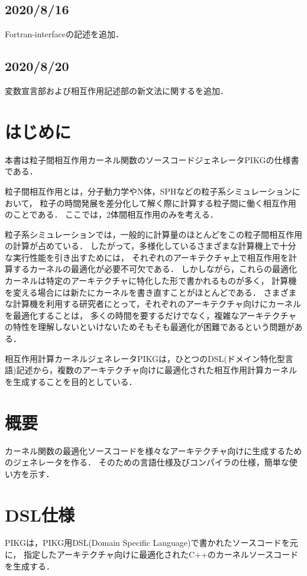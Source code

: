 \documentclass{article}
\begin{document}
\subsection{2020/8/16}
Fortran-interfaceの記述を追加．
\subsection{2020/8/20}
変数宣言部および相互作用記述部の新文法に関するを追加．

\section{はじめに}
本書は粒子間相互作用カーネル関数のソースコードジェネレータPIKGの仕様書である．

粒子間相互作用とは，分子動力学やN体，SPHなどの粒子系シミュレーションにおいて，
粒子の時間発展を差分化して解く際に計算する粒子間に働く相互作用のことである．
ここでは，2体間相互作用のみを考える．

粒子系シミュレーションでは，一般的に計算量のほとんどをこの粒子間相互作用の計算が占めている．
したがって，多様化しているさまざまな計算機上で十分な実行性能を引き出すためには，
それぞれのアーキテクチャ上で相互作用を計算するカーネルの最適化が必要不可欠である．
しかしながら，これらの最適化カーネルは特定のアーキテクチャに特化した形で書かれるものが多く，
計算機を変える場合には新たにカーネルを書き直すことがほとんどである．
さまざまな計算機を利用する研究者にとって，それぞれのアーキテクチャ向けにカーネルを最適化することは，
多くの時間を要するだけでなく，複雑なアーキテクチャの特性を理解しないといけないためそもそも最適化が困難であるという問題がある．

相互作用計算カーネルジェネレータPIKGは，ひとつのDSL(ドメイン特化型言語)記述から，複数のアーキテクチャ向けに最適化された相互作用計算カーネルを生成することを目的としている．

\section{概要}
カーネル関数の最適化ソースコードを様々なアーキテクチャ向けに生成するためのジェネレータを作る．
そのための言語仕様及びコンパイラの仕様，簡単な使い方を示す．

\section{DSL仕様}
PIKGは，PIKG用DSL(Domain Specific Language)で書かれたソースコードを元に，
指定したアーキテクチャ向けに最適化されたC++のカーネルソースコードを生成する．
\end{document}
